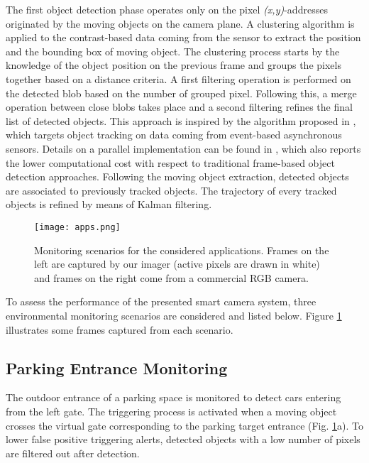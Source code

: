 \documentclass[journal]{IEEEtran}
\begin{document}
The first object detection phase operates only on the pixel \textit{(x,y)}-addresses originated by the moving objects on the camera plane. A clustering algorithm is applied to the contrast-based data coming from the sensor to extract the position and the bounding box of moving object. The clustering process starts by the knowledge of the object position on the previous frame and groups the pixels together based on a distance criteria. A first filtering operation is performed on the detected blob based on the number of grouped pixel. Following this, a merge operation between close blobs takes place and a second filtering refines the final list of detected objects.
This approach is inspired by the algorithm proposed in \cite{Litzenberger2006}, which targets object tracking on data coming from event-based asynchronous sensors. Details on a parallel implementation can be found in \cite{Rusci2016}, which also reports the lower computational cost with respect to traditional frame-based object detection approaches.
Following the moving object extraction, detected objects are associated to previously tracked objects. 
The trajectory of every tracked objects is refined by means of Kalman filtering. 

\begin{figure}[]
	\centering
  	\texttt{[image: apps.png]}
	\caption{Monitoring scenarios for the considered applications. Frames on the left are captured by our imager (active pixels are drawn in white) and frames on the right come from a commercial RGB  camera. }
	\label{fig:apps_fig}       %
\end{figure}


To assess the performance of the presented smart camera system, three environmental monitoring scenarios are considered and listed below. Figure \ref{fig:apps_fig} illustrates some frames captured from each scenario.

\subsection{Parking Entrance Monitoring}
The outdoor entrance of a parking space is monitored to detect cars entering from the left gate. The triggering process is activated when a moving object crosses the virtual gate corresponding to the parking target entrance (Fig. \ref{fig:apps_fig}a). To lower false positive triggering alerts, detected objects with a low number of pixels are filtered out after detection. 
\end{document}
